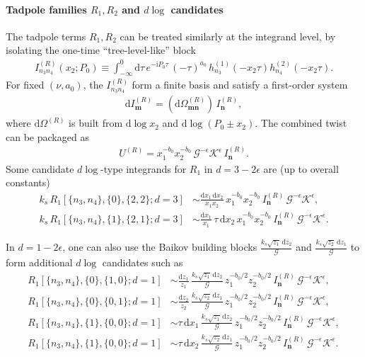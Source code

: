 \documentclass[a4paper,12pt]{article}
\newcommand{\n}{\nonumber}
\def\di{{\mathrm{d}}}
\def\ii{\mathrm{i}}
\def\ep{\epsilon}
\newcommand{\mG}{\mathcal{G}}
\newcommand{\mK}{\mathcal{K}}
\begin{document}
\paragraph{Tadpole families $R_1,R_2$ and $d\log$ candidates}
The tadpole terms $R_1,R_2$ can be treated similarly at the integrand level, by isolating the one-time ``tree-level-like'' block
\begin{align}
	I^{(R)}_{n_3 n_4}(x_2;P_0)\equiv \int_{-\infty}^0 \di\tau\,e^{-\ii P_0\tau}\,(-\tau)^{a_0}\,h_{n_3}^{(1)}(-x_2\tau)h_{n_4}^{(2)}(-x_2\tau).
\end{align}
For fixed $(\nu,a_0)$, the $I^{(R)}_{n_3 n_4}$ form a finite basis and satisfy a first-order system
\begin{align}
	\di I^{(R)}_{\bm m}=\left(\di\Omega^{(R)}_{\bm m\bm n}\right)\,I^{(R)}_{\bm n},
\end{align}
where $\di\Omega^{(R)}$ is built from $\di\log x_2$ and $\di\log(P_0\pm x_2)$. The combined twist can be packaged as
\begin{align}
	U^{(R)} = x_1^{-b_0}x_2^{-b_0}\,\mG^{-\ep}\mK^{\ep}\,I^{(R)}_{\bm n}.
\end{align}
Some candidate $d\log$-type integrands for $R_1$ in $d=3-2\ep$ are (up to overall constants)
\begin{align}
	k_s\,R_1[\{n_3,n_4\},\{0\},\{2,2\};d=3]
	&\sim \frac{\di x_1\,\di x_2}{x_1 x_2}\,x_1^{-b_0}x_2^{-b_0}\,I^{(R)}_{\bm n}\,\mG^{-\ep}\mK^{\ep}, \n\\
	k_s\,R_1[\{n_3,n_4\},\{1\},\{2,1\};d=3]
	&\sim \frac{\di x_1}{x_1}\,\tau\,\di x_2\,x_1^{-b_0}x_2^{-b_0}\,I^{(R)}_{\bm n}\,\mG^{-\ep}\mK^{\ep}.
\end{align}

In $d=1-2\ep$, one can also use the Baikov building blocks
$\frac{k_s\sqrt{z_1}\,\di z_2}{\mG}$ and $\frac{k_s\sqrt{z_2}\,\di z_1}{\mG}$ to form additional $d\log$ candidates such as
\begin{align}
	R_1[\{n_3,n_4\},\{0\},\{1,0\};d=1]
	&\sim \frac{\di z_1}{z_1}\,\frac{k_s\sqrt{z_1}\,\di z_2}{\mG}\,
	z_1^{-b_0/2}z_2^{-b_0/2}\,I^{(R)}_{\bm n}\,\mG^{-\ep}\mK^{\ep}, \n\\
	R_1[\{n_3,n_4\},\{0\},\{0,1\};d=1]
	&\sim \frac{\di z_2}{z_2}\,\frac{k_s\sqrt{z_2}\,\di z_1}{\mG}\,
	z_1^{-b_0/2}z_2^{-b_0/2}\,I^{(R)}_{\bm n}\,\mG^{-\ep}\mK^{\ep}, \n\\
	R_1[\{n_3,n_4\},\{1\},\{0,0\};d=1]
	&\sim \tau\,\di x_1\,\frac{k_s\sqrt{z_1}\,\di z_2}{\mG}\,
	z_1^{-b_0/2}z_2^{-b_0/2}\,I^{(R)}_{\bm n}\,\mG^{-\ep}\mK^{\ep}, \n\\
	R_1[\{n_3,n_4\},\{1\},\{0,0\};d=1]
	&\sim \tau\,\di x_2\,\frac{k_s\sqrt{z_2}\,\di z_1}{\mG}\,
	z_1^{-b_0/2}z_2^{-b_0/2}\,I^{(R)}_{\bm n}\,\mG^{-\ep}\mK^{\ep}.
\end{align}
\end{document}
